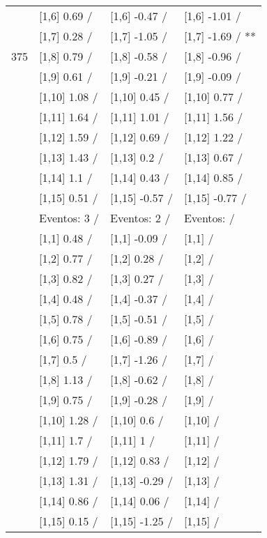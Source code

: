 \begin{table}
\begin{tabular}[t]{llll}
 & {}[1,6] 0.69  / & {}[1,6] -0.47  / & {}[1,6] -1.01  /\\
 & {}[1,7] 0.28  / & {}[1,7] -1.05  / & {}[1,7] -1.69  / **\\
375 & {}[1,8] 0.79  / & {}[1,8] -0.58  / & {}[1,8] -0.96  /\\
\addlinespace
 & {}[1,9] 0.61  / & {}[1,9] -0.21  / & {}[1,9] -0.09  /\\
 & {}[1,10] 1.08  / & {}[1,10] 0.45  / & {}[1,10] 0.77  /\\
 & {}[1,11] 1.64  / & {}[1,11] 1.01  / & {}[1,11] 1.56  /\\
 & {}[1,12] 1.59  / & {}[1,12] 0.69  / & {}[1,12] 1.22  /\\
 & {}[1,13] 1.43  / & {}[1,13] 0.2  / & {}[1,13] 0.67  /\\
\addlinespace
 & {}[1,14] 1.1  / & {}[1,14] 0.43  / & {}[1,14] 0.85  /\\
 & {}[1,15] 0.51  / & {}[1,15] -0.57  / & {}[1,15] -0.77  /\\
 & Eventos:  3 / & Eventos:  2 / & Eventos:   /\\
 & {}[1,1] 0.48  / & {}[1,1] -0.09  / & {}[1,1]  /\\
 & {}[1,2] 0.77  / & {}[1,2] 0.28  / & {}[1,2]  /\\
\addlinespace
 & {}[1,3] 0.82  / & {}[1,3] 0.27  / & {}[1,3]  /\\
 & {}[1,4] 0.48  / & {}[1,4] -0.37  / & {}[1,4]  /\\
 & {}[1,5] 0.78  / & {}[1,5] -0.51  / & {}[1,5]  /\\
 & {}[1,6] 0.75  / & {}[1,6] -0.89  / & {}[1,6]  /\\
 & {}[1,7] 0.5  / & {}[1,7] -1.26  / & {}[1,7]  /\\
\addlinespace
500 & {}[1,8] 1.13  / & {}[1,8] -0.62  / & {}[1,8]  /\\
 & {}[1,9] 0.75  / & {}[1,9] -0.28  / & {}[1,9]  /\\
 & {}[1,10] 1.28  / & {}[1,10] 0.6  / & {}[1,10]  /\\
 & {}[1,11] 1.7  / & {}[1,11] 1  / & {}[1,11]  /\\
 & {}[1,12] 1.79  / & {}[1,12] 0.83  / & {}[1,12]  /\\
\addlinespace
 & {}[1,13] 1.31  / & {}[1,13] -0.29  / & {}[1,13]  /\\
 & {}[1,14] 0.86  / & {}[1,14] 0.06  / & {}[1,14]  /\\
 & {}[1,15] 0.15  / & {}[1,15] -1.25  / & {}[1,15]  /\\
\bottomrule
\end{tabular}
\end{table}

